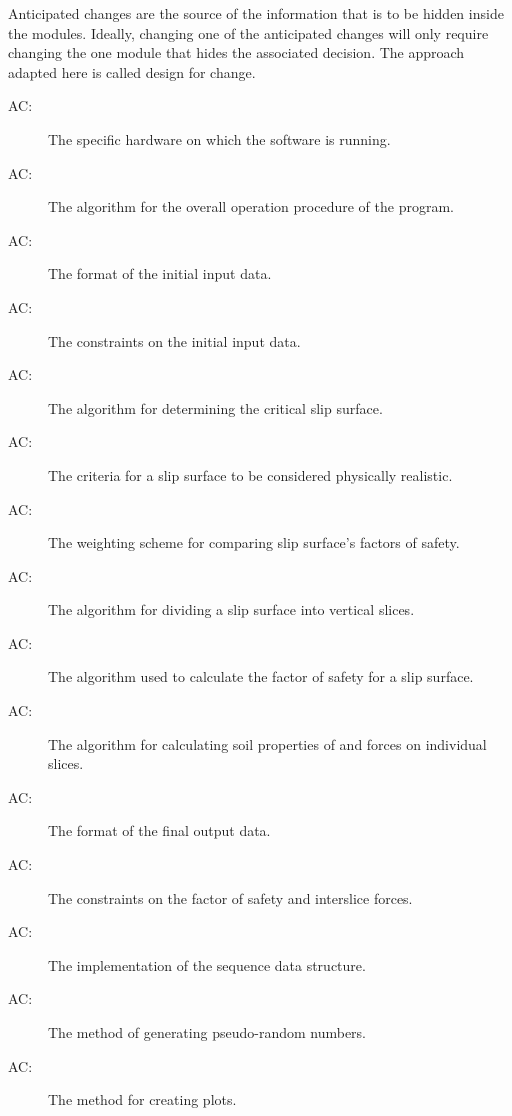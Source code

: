 \documentclass[12pt, titlepage]{article}
\newcounter{acnum}
\begin{document}
\hspace{3ex}Anticipated changes are the source of the information that
is to be hidden inside the modules. Ideally, changing one of the
anticipated changes will only require changing the one module that
hides the associated decision. The approach adapted here is called
design for change.

\begin{description}
\item[AC\theacnum \label{AC_hardware}:] The
  specific hardware on which the software is running.
\item[AC\theacnum \label{AC_Control}:] The
  algorithm for the overall operation procedure of the program.
\item[AC\theacnum \label{AC_input}:] The format
  of the initial input data.
\item[AC\theacnum \label{AC_inputConstraints}:] The       
constraints on the initial input data.
\item[AC\theacnum \label{AC_GenAlg}:] The algorithm
  for determining the critical slip surface.
\item[AC\theacnum \label{AC_Kin}:] The criteria for
  a slip surface to be considered physically realistic.
\item[AC\theacnum \label{AC_FSweight}:] The
  weighting scheme for comparing slip surface's factors of safety.
\item[AC\theacnum \label{AC_Slicer}:] The
  algorithm for dividing a slip surface into vertical slices.
\item[AC\theacnum \label{AC_CalcFS}:] The algorithm used 
to calculate the factor of safety for a slip surface.
\item[AC\theacnum \label{AC_PropSorter}:] The
  algorithm for calculating soil properties of and forces on individual slices.
\item[AC\theacnum \label{AC_output}:] The format
  of the final output data.
\item[AC\theacnum \label{AC_outputConstraints}:] The     
  constraints on the factor of safety and interslice forces.
\item[AC\theacnum \label{AC_Array}:] The
  implementation of the sequence data structure.
\item[AC\theacnum \label{AC_Rand}:] The method
  of generating pseudo-random numbers.
\item[AC\theacnum \label{AC_Plot}:] The method
  for creating plots.
\end{description}
\end{document}
